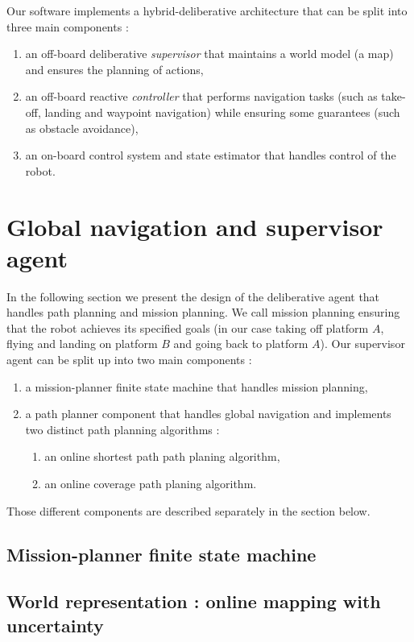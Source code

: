 \documentclass[11pt]{article}
\begin{document}
Our software implements a hybrid-deliberative architecture that can be split into three main components :
\begin{enumerate}
    \item an off-board deliberative \textit{supervisor} that maintains a world model (a map) and ensures the planning of actions,
    \item an off-board reactive \textit{controller} that performs navigation tasks (such as take-off, landing and waypoint navigation) while ensuring some guarantees (such as obstacle avoidance),
    \item an on-board control system and state estimator that handles control of the robot.
\end{enumerate}


\section{Global navigation and supervisor agent}

In the following section we present the design of the deliberative agent that handles path planning and mission planning. We call mission planning ensuring that the robot achieves its specified goals (in our case taking off platform $A$, flying and landing on platform $B$ and going back to platform $A$). Our supervisor agent can be split up into two main components : 
\begin{enumerate}
    \item a mission-planner finite state machine that handles mission planning,
    \item a path planner component that handles global navigation and implements two distinct path planning algorithms : 
    \begin{enumerate}
        \item an online shortest path path planing algorithm,
        \item an online coverage path planing algorithm.
    \end{enumerate}
\end{enumerate}

Those different components are described separately in the section below.


\subsection{Mission-planner finite state machine}

\subsection{World representation : online mapping with uncertainty}
\end{document}

